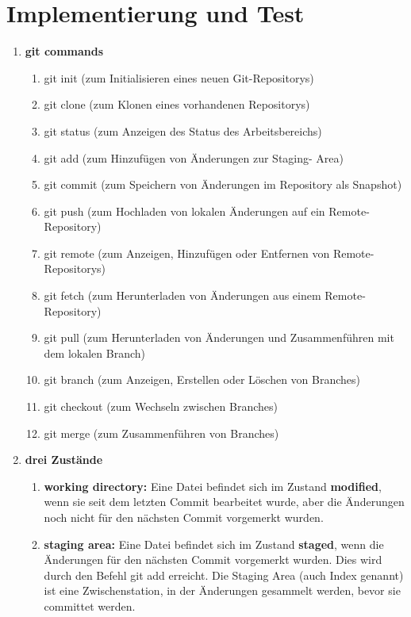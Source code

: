 \documentclass{article}
\begin{document}
\section*{Implementierung und Test}
  \begin{enumerate}[label=\alph*)]
   \item
   \textbf{git commands}
   \begin{enumerate}[label=\arabic*)]
\item git init (zum Initialisieren eines neuen Git-Repositorys)
\item git clone (zum Klonen eines vorhandenen Repositorys)
\item git status (zum Anzeigen des Status des Arbeitsbereichs)
\item git add (zum Hinzufügen von Änderungen zur Staging- Area)
\item git commit (zum Speichern von Änderungen im Repository als Snapshot)
\item git push (zum Hochladen von lokalen Änderungen auf ein Remote-Repository)
\item git remote (zum Anzeigen, Hinzufügen oder Entfernen von Remote-Repositorys)
\item git fetch (zum Herunterladen von Änderungen aus einem Remote-Repository)
\item git pull (zum Herunterladen von Änderungen und Zusammenführen mit dem lokalen Branch)
\item git branch (zum Anzeigen, Erstellen oder Löschen von Branches)
\item git checkout (zum Wechseln zwischen Branches)
\item git merge (zum Zusammenführen von Branches)
   \end{enumerate}
   
   \item 
   \textbf{drei Zustände}
   \begin{enumerate}[label=\arabic*)]
   \item \textbf{working directory:}
   Eine Datei befindet sich im Zustand \textbf{modified}, wenn sie seit dem letzten Commit bearbeitet wurde, aber die Änderungen noch nicht für den nächsten Commit vorgemerkt wurden.
   
   \item \textbf{staging area:}
   Eine Datei befindet sich im Zustand \textbf{staged}, wenn die Änderungen für den nächsten Commit vorgemerkt wurden. Dies wird durch den Befehl git add erreicht. Die Staging Area (auch Index genannt) ist eine Zwischenstation, in der Änderungen gesammelt werden, bevor sie committet werden.
   

\end{enumerate}
\end{enumerate}
\end{document}
